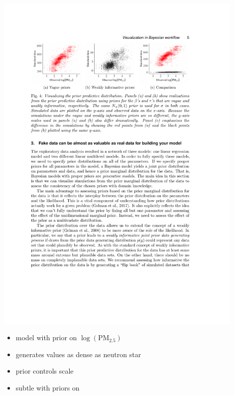 \documentclass[10pt]{report}
\begin{document}
\begin{center}
\vspace*{-8pt}
\includegraphics[width=0.9\textwidth]{img/prior-predictive-eg.pdf}
\end{center}
\vspace*{-10pt}
\begin{itemize}
\item {} model with prior on
  $\log(\textrm{PM}_{2.5})$
\item {} generates values as dense as neutron star
\item {} prior controls scale
\item subtle with priors on 
\end{itemize}
\end{document}
